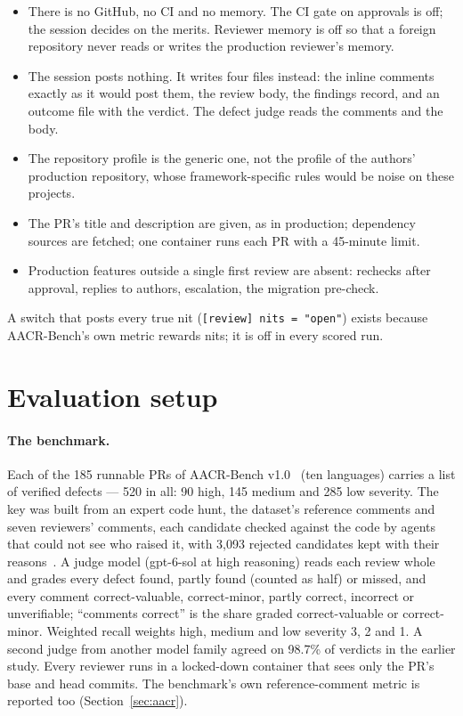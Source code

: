 \documentclass[11pt,a4paper]{article}
\newcommand{\code}[1]{\texttt{#1}}
\begin{document}
\begin{itemize}
  \item There is no GitHub, no CI and no memory. The CI gate on approvals is
  off; the session decides on the merits. Reviewer memory is off so that a
  foreign repository never reads or writes the production reviewer's memory.
  \item The session posts nothing. It writes four files instead: the inline
  comments exactly as it would post them, the review body, the findings
  record, and an outcome file with the verdict. The defect judge reads the
  comments and the body.
  \item The repository profile is the generic one, not the profile of the
  authors' production repository, whose framework-specific rules would be
  noise on these projects.
  \item The PR's title and description are given, as in production;
  dependency sources are fetched; one container runs each PR with a
  45-minute limit.
  \item Production features outside a single first review are absent:
  rechecks after approval, replies to authors, escalation, the migration
  pre-check.
\end{itemize}

\noindent A switch that posts every true nit (\code{[review] nits = "open"})
exists because AACR-Bench's own metric rewards nits; it is off in every
scored run.

\section{Evaluation setup}
\label{sec:setup}

\paragraph{The benchmark.} Each of the 185 runnable PRs of AACR-Bench
v1.0~\cite{aacrbench} (ten languages) carries a list of verified defects ---
520 in all: 90 high, 145 medium and 285 low severity. The key was built from
an expert code hunt, the dataset's reference comments and seven reviewers'
comments, each candidate checked against the code by agents that could not
see who raised it, with 3{,}093 rejected candidates kept with their
reasons~\cite{qcrbench}. A judge model (gpt-6-sol at high reasoning) reads
each review whole and grades every defect found, partly found (counted as
half) or missed, and every comment correct-valuable, correct-minor, partly
correct, incorrect or unverifiable; ``comments correct'' is the share graded
correct-valuable or correct-minor. Weighted recall weights high, medium and
low severity 3, 2 and 1. A second judge from another model family agreed on
98.7\% of verdicts in the earlier study. Every reviewer runs in a locked-down
container that sees only the PR's base and head commits. The benchmark's own
reference-comment metric is reported too (Section~\ref{sec:aacr}).
\end{document}
